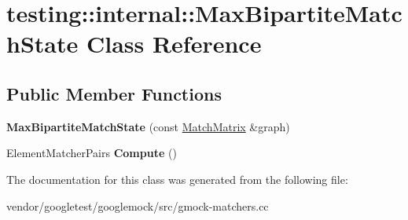 \hypertarget{classtesting_1_1internal_1_1_max_bipartite_match_state}{}\section{testing\+:\+:internal\+:\+:Max\+Bipartite\+Match\+State Class Reference}
\label{classtesting_1_1internal_1_1_max_bipartite_match_state}
\subsection*{Public Member Functions}
\begin{DoxyCompactItemize}
\item 
\mbox{\label{classtesting_1_1internal_1_1_max_bipartite_match_state_a9d0166d5cc7afd1b741f6c312df72b54}} 
{\bfseries Max\+Bipartite\+Match\+State} (const \hyperlink{classtesting_1_1internal_1_1_match_matrix}{Match\+Matrix} \&graph)
\item 
\mbox{\label{classtesting_1_1internal_1_1_max_bipartite_match_state_af6efab664ee390925b24d023f1368192}} 
Element\+Matcher\+Pairs {\bfseries Compute} ()
\end{DoxyCompactItemize}


The documentation for this class was generated from the following file\+:\begin{DoxyCompactItemize}
\item 
vendor/googletest/googlemock/src/gmock-\/matchers.\+cc\end{DoxyCompactItemize}
